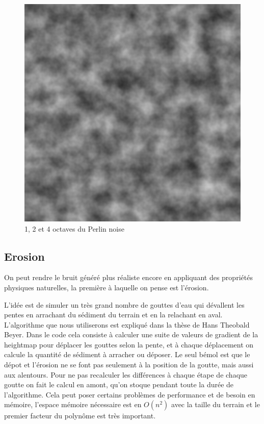 \documentclass[11pt]{article} %
\begin{document}
\begin{figure}[h]
	\includegraphics[scale=.3]{perlin_4_octaves}
	\caption{1, 2 et 4 octaves du Perlin noise}
	\label{fig:layered_noise}
\end{figure}


\subsection{Erosion}

On peut rendre le bruit généré plus réaliste encore en appliquant des propriétés physiques naturelles, la première à laquelle on pense est l'érosion.

L'idée est de simuler un très grand nombre de gouttes d'eau qui dévallent les pentes en arrachant du sédiment du terrain et en la relachant en aval. L'algorithme que nous utiliserons est expliqué dans la thèse de Hans Theobald Beyer\cite{erosion}.
Dans le code cela consiste à calculer une suite de valeurs de gradient de la heightmap pour déplacer les gouttes selon la pente, et à chaque déplacement on calcule la quantité de sédiment à arracher ou déposer. Le seul bémol est que le dépot et l'érosion ne se font pas seulement à la position de la goutte, mais aussi aux alentours. Pour ne pas recalculer les différences à chaque étape de chaque goutte on fait le calcul en amont, qu'on stoque pendant toute la durée de l'algorithme. Cela peut poser certains problèmes de performance et de besoin en mémoire, l'espace mémoire nécessaire est en $O(n^2)$ avec la taille du terrain et le premier facteur du polynôme est très important.
\end{document}
